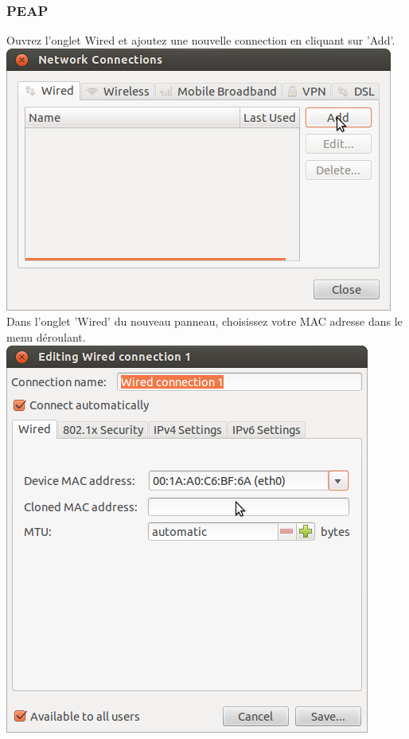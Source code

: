 \subsubsection{PEAP}
Ouvrez l'onglet Wired et ajoutez une nouvelle connection en cliquant sur 'Add'.\\
\includegraphics[width=\screenShotSize{}]{imgUser/wiredAdd.png}\\
Dans l'onglet 'Wired' du nouveau panneau, choisissez votre MAC adresse dans le menu déroulant.\\
\includegraphics[width=\screenShotSize{}]{imgUser/setMac.png}\\
